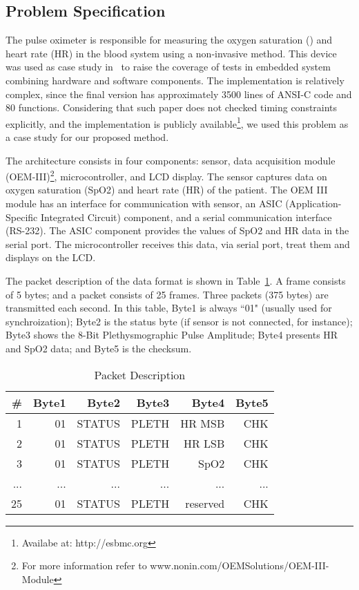 \documentclass{llncs}
\begin{document}
\subsection{Problem Specification}

The pulse oximeter is responsible for measuring the oxygen saturation () and heart rate (HR) in the blood system using a
non-invasive method. 
This device was used as case study in~\cite{Cordeiro09} to raise the coverage of tests in embedded system combining
hardware and software components. The implementation is relatively complex, since the final version has approximately 3500 lines of ANSI-C code 
and 80 functions. 
Considering that such paper does not checked timing constraints explicitly, 
and the implementation is publicly available\footnote{Availabe at: http://esbmc.org}, 
we used this problem as a case study for our proposed method.

The architecture consists in four components: sensor, data acquisition module 
(OEM-III)\footnote{For more information refer to www.nonin.com/OEMSolutions/OEM-III-Module}, microcontroller, and LCD display.
The sensor captures data on oxygen saturation (SpO2) and heart rate (HR) of the patient.
The OEM III module has an interface for communication with sensor, an ASIC (Application-Specific Integrated Circuit) component, 
and a serial communication interface (RS-232).
The ASIC component provides the values of SpO2 and HR data in the serial port.
The microcontroller receives this data, via serial port, treat them and displays on the LCD.

The packet description of the data format is shown in Table~\ref{table:packet}.
A frame consists of 5 bytes; and a packet consists of 25 frames. Three packets (375 bytes) are transmitted each second.
In this table, Byte1 is always ``01" (usually used for synchroization); 
Byte2 is the status byte (if sensor is not connected, for instance);
Byte3 shows the 8-Bit Plethysmographic Pulse Amplitude; Byte4 presents HR and SpO2 data; 
and Byte5 is the checksum.




\renewcommand{\baselinestretch}{1.2}
\setlength{\tabcolsep}{4pt}
\begin{table}[!hbt]
\begin{center}
\caption{Packet Description}
\label{table:packet}
\begin{tabular}{| r | r | r | r | r | r | }
\hline
    \# & Byte1 & Byte2 & Byte3 & Byte4 & Byte5  \\
\hline\hline
    1 & 01 & STATUS & PLETH & HR MSB & CHK \\ 
\hline
    2 & 01 & STATUS & PLETH & HR LSB & CHK \\ 
\hline
    3 & 01 & STATUS & PLETH & SpO2 & CHK \\ 
\hline
    ... & ... & ... & ... & ... & ... \\ 
\hline
    25 & 01 & STATUS & PLETH & reserved & CHK \\ 
\hline
\end{tabular}
\end{center}
\end{table}
\end{document}
